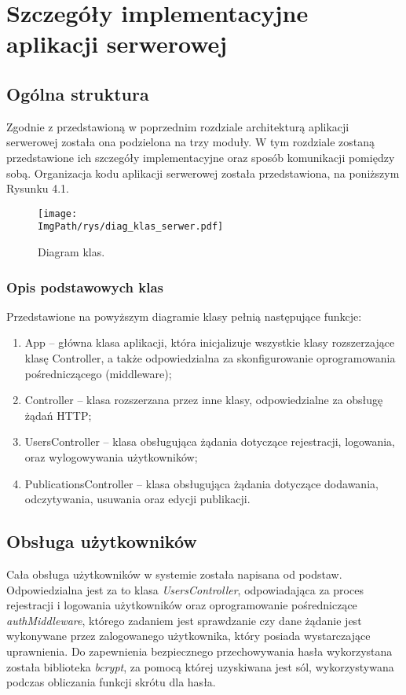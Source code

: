\documentclass[a4paper,12pt,twoside,openany]{report}
\newcommand{\ImgPath}{.}
\begin{document}
\chapter{Szczegóły implementacyjne aplikacji serwerowej}
\section{Ogólna struktura}
Zgodnie z przedstawioną w poprzednim rozdziale architekturą aplikacji serwerowej została ona podzielona na trzy moduły. W tym rozdziale zostaną przedstawione ich szczegóły implementacyjne oraz sposób komunikacji pomiędzy sobą. Organizacja kodu aplikacji serwerowej została przedstawiona, na poniższym Rysunku 4.1.

 \begin{figure}[!htbp]
	\begin{center}
		\centering
		\texttt{[image: \\ImgPath/rys/diag\_klas\_serwer.pdf]}
	\end{center}
	\caption{Diagram klas.}
	\label{diagramKlas}
\end{figure}
\subsection{Opis podstawowych klas}
Przedstawione na powyższym diagramie klasy pełnią następujące funkcje:
\begin{enumerate}
	\item App -- główna klasa aplikacji, która inicjalizuje wszystkie klasy rozszerzające klasę Controller, a także odpowiedzialna za skonfigurowanie oprogramowania pośredniczącego (middleware)\cite{Middleware};
	
	\item Controller -- klasa rozszerzana przez inne klasy, odpowiedzialne za obsługę żądań  HTTP;
	
	\item UsersController -- klasa obsługująca żądania dotyczące rejestracji, logowania, oraz wylogowywania użytkowników;
	
	\item PublicationsController -- klasa obsługująca żądania dotyczące dodawania, odczytywania, usuwania oraz edycji publikacji.
	
\end{enumerate}

\section{Obsługa użytkowników}
Cała obsługa użytkowników w systemie została napisana od podstaw. Odpowiedzialna jest za to klasa \textit{UsersController}, odpowiadająca za proces rejestracji i logowania użytkowników oraz oprogramowanie pośredniczące \textit{authMiddleware}, którego zadaniem jest sprawdzanie czy dane żądanie jest wykonywane przez zalogowanego użytkownika, który posiada wystarczające uprawnienia. Do zapewnienia bezpiecznego przechowywania hasła wykorzystana została biblioteka \textit{bcrypt}, za pomocą której uzyskiwana jest sól, wykorzystywana podczas obliczania funkcji skrótu dla hasła. 
\end{document}

